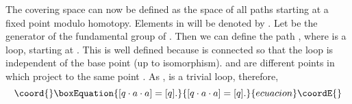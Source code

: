 \documentclass[a4paper,12pt]{article}
\begin{document}
The covering space \coordHE{} can now be defined as the space of all 
paths starting at a fixed point \coordHE{} modulo 
homotopy. Elements in \coordHE{} will be denoted by \myHighlight{$[q]$}\coordHE{}. Let \myHighlight{$[a]$}\coordHE{} 
be the generator of the fundamental group of \coordHE{}. 
Then we can define the 
path \myHighlight{$[q \cdot a]$}\coordHE{}, where \myHighlight{$[a]$}\coordHE{} is a loop, starting at \coordHE{}. 
This is well defined because \coordHE{} is connected so that the loop is 
independent of the base point \coordHE{} (up to isomorphism). 
\myHighlight{$[q \cdot a]$}\coordHE{} and \myHighlight{$[q]$}\coordHE{} are different points in \coordHE{} which 
project  to the same point \coordHE{}.
 As \coordHE{}, \myHighlight{$[a^2]$}\coordHE{} is a trivial loop, 
therefore, 
%
\begin{equation}\coord{}\boxEquation{
\label{a^2}
[q\cdot a \cdot a] = [q].  
}{
[q\cdot a \cdot a] = [q].  
}{ecuacion}\coordE{}\end{equation}
\end{document}
